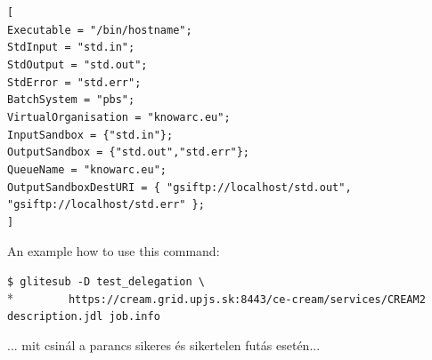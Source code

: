 \documentclass{article}
\begin{document}
\begin{minipage}{\textwidth}
\begin{framed}
\verb#[#\\
\verb#Executable = "/bin/hostname";#\\
\verb#StdInput = "std.in";#\\
\verb#StdOutput = "std.out";#\\
\verb#StdError = "std.err";#\\
\verb#BatchSystem = "pbs";#\\
\verb#VirtualOrganisation = "knowarc.eu";#\\
\verb#InputSandbox = {"std.in"};#\\
\verb#OutputSandbox = {"std.out","std.err"};#\\
\verb#QueueName = "knowarc.eu";#\\
\verb#OutputSandboxDestURI = { "gsiftp://localhost/std.out", "gsiftp://localhost/std.err" };#\\
\verb#]#
\end{framed}
\end{minipage}

An example how to use this command:
\begin{shaded}\verb#$ glitesub -D test_delegation \#\\*
\verb#        https://cream.grid.upjs.sk:8443/ce-cream/services/CREAM2 description.jdl job.info#\end{shaded}
... mit csinál a parancs sikeres és sikertelen futás esetén... \par
\end{document}
